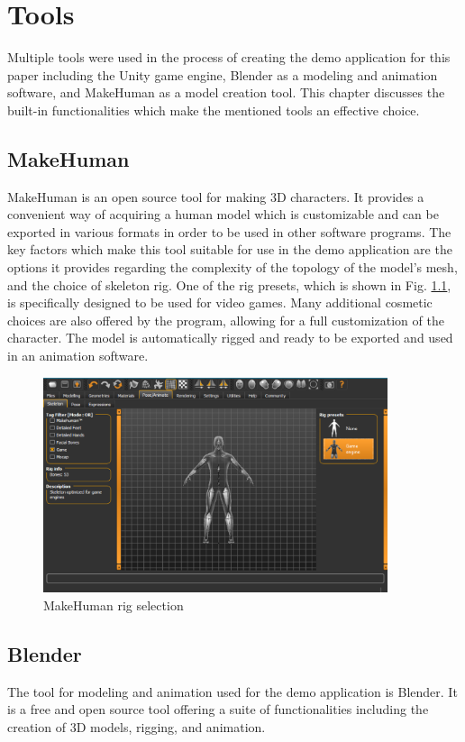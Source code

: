 \chapter{Tools} 
Multiple tools were used in the process of creating the demo application for
this paper including the Unity game engine, Blender as a modeling and animation
software, and MakeHuman as a model creation tool. This chapter discusses the
built-in functionalities which make the mentioned tools an effective choice.

\section{MakeHuman}
MakeHuman is an open source tool for making 3D characters. It provides
a convenient way of acquiring a human model which is customizable and can be
exported in various formats in order to be used in other software programs. The
key factors which make this tool suitable for use in the demo application are the
options it provides regarding the complexity of the topology of the model's
mesh, and the choice of skeleton rig. One of the rig presets, which is shown in
Fig. \ref{fig:mh_rig}, is specifically designed to be used for video games. Many
additional cosmetic choices are also offered by the program, allowing for a full
customization of the character. The model is automatically rigged and ready to
be exported and used in an animation software. 

\begin{figure}[!h]
    \centering
    \includegraphics[width=0.9\textwidth]{grafika/make_human_rig.eps}
    \caption{MakeHuman rig selection}
    \label{fig:mh_rig}
\end{figure}

\section{Blender}
The tool for modeling and animation used for the demo application is
Blender. It is a free and open source tool offering a suite of functionalities
including the creation of 3D models, rigging, and animation. 

